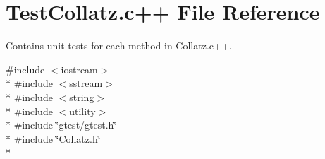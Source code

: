 \hypertarget{TestCollatz_8c_09_09}{\section{Test\-Collatz.\-c++ File Reference}
\label{TestCollatz_8c_09_09}
}


Contains unit tests for each method in Collatz.\-c++.  


{\ttfamily \#include $<$iostream$>$}\\*
{\ttfamily \#include $<$sstream$>$}\\*
{\ttfamily \#include $<$string$>$}\\*
{\ttfamily \#include $<$utility$>$}\\*
{\ttfamily \#include \char`\"{}gtest/gtest.\-h\char`\"{}}\\*
{\ttfamily \#include \char`\"{}Collatz.\-h\char`\"{}}\\*
